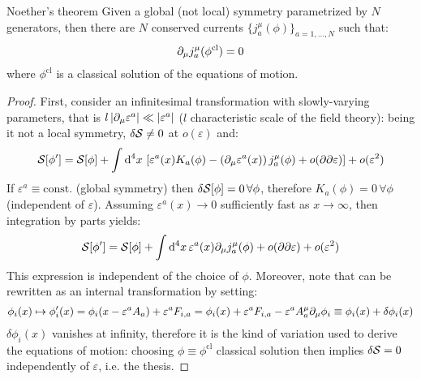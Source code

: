 \begin{theorem}{Noether's theorem}{}
  Given a global (not local) symmetry parametrized by $ N $ generators, then there are $ N $ conserved currents $ \{j^\mu_a(\phi)\}_{a = 1, \dots, N} $ such that:
  \begin{equation}
    \partial_\mu j^\mu_a(\phi^\mathrm{cl}) = 0
  \end{equation}
  where $ \phi^\mathrm{cl} $ is a classical solution of the equations of motion.
\end{theorem}

\begin{proofbox}
  \begin{proof}
    First, consider an infinitesimal transformation with slowly-varying parameters, that is $ l \left\lvert\partial_\mu \varepsilon^a\right\rvert \ll \left\lvert\varepsilon^a\right\rvert $ ($ l $ characteristic scale of the field theory): being it not a local symmetry, $ \delta \mathcal{S} \neq 0 $ at $ o(\varepsilon) $ and:
    \begin{equation*}
      \mathcal{S}[\phi'] = \mathcal{S}[\phi] + \int \mathrm{d}^4 x\, \left[ \varepsilon^a(x) K_a(\phi) - \left( \partial_\mu \varepsilon^a(x) \right) j^\mu_a(\phi) + o(\partial \partial \varepsilon) \right] + o(\varepsilon^2)
    \end{equation*}
    If $ \varepsilon^a \equiv \mathrm{const.} $ (global symmetry) then $ \delta \mathcal{S}[\phi] = 0 \,\forall \phi $, therefore $ K_a(\phi) = 0 \,\forall \phi $ (independent of $ \varepsilon $). Assuming $ \varepsilon^a(x) \rightarrow 0 $ sufficiently fast as $ x \rightarrow \infty $, then integration by parts yields:
    \begin{equation*}
      \mathcal{S}[\phi'] = \mathcal{S}[\phi] + \int \mathrm{d}^4 x\, \varepsilon^a(x) \partial_\mu j^\mu_a(\phi) + o(\partial \partial \varepsilon) + o(\varepsilon^2)
    \end{equation*}
    This expression is independent of the choice of $ \phi $. Moreover, note that  can be rewritten as an internal transformation by setting:
    \begin{equation*}
      \phi_i(x) \mapsto \phi'_i(x) = \phi_i(x - \varepsilon^a A_a) + \varepsilon^a F_{i,a} = \phi_i(x) + \varepsilon^a F_{i,a} - \varepsilon^a A^\mu_a \partial_\mu \phi_i \equiv \phi_i(x) + \delta \phi_i(x)
    \end{equation*}
    $ \delta \phi_i(x) $ vanishes at infinity, therefore it is the kind of variation used to derive the equations of motion: choosing $ \phi \equiv \phi^\mathrm{cl} $ classical solution then implies $ \delta \mathcal{S} = 0 $ independently of $ \varepsilon $, i.e. the thesis.
  \end{proof}
\end{proofbox}

